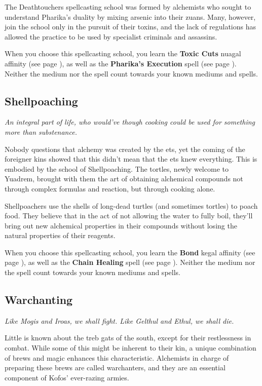     The Deathtouchers spellcasting school was formed by alchemists who sought to understand Pharika's duality by mixing arsenic into their zuans.
    Many, however, join the school only in the pursuit of their toxins, and the lack of regulations has allowed the practice to be used by specialist criminals and assassins.

    When you choose this spellcasting school, you learn the \textbf{Toxic Cuts} nuagal affinity (see page \pageref{medium::toxiccuts}), as well as the \textbf{Pharika's Execution} spell (see page \pageref{spell::pharikasexecution}).
    Neither the medium nor the spell count towards your known mediums and spells.

\subsection*{Shellpoaching} \label{ssec::shellpoaching} %
    \textit{An integral part of life, who would've though cooking could be used for something more than substenance.}

    Nobody questions that alchemy was created by the ets, yet the coming of the foreigner kins showed that this didn't mean that the ets knew everything.
    This is embodied by the school of Shellpoaching.
    The tortles, newly welcome to Yuadrem, brought with them the art of obtaining alchemical compounds not through complex formulas and reaction, but through cooking alone.

    Shellpoachers use the shells of long-dead turtles (and sometimes tortles) to poach food.
    They believe that in the act of not allowing the water to fully boil, they'll bring out new alchemical properties in their compounds without losing the natural properties of their reagents.

    When you choose this spellcasting school, you learn the \textbf{Bond} kegal affinity (see page \pageref{medium::bond}), as well as the \textbf{Chain Healing} spell (see page \pageref{spell::chainhealing}).
    Neither the medium nor the spell count towards your known mediums and spells.

\subsection*{Warchanting} \label{ssec::warchanting}
    \textit{Like Mogis and Iroas, we shall fight.
    Like Gelthul and Ethul, we shall die.}

    Little is known about the treb gats of the south, except for their restlessness in combat.
    While some of this might be inherent to their kin, a unique combination of brews and magic enhances this characteristic.
    Alchemists in charge of preparing these brews are called warchanters, and they are an essential component of Kofos' ever-razing armies.

